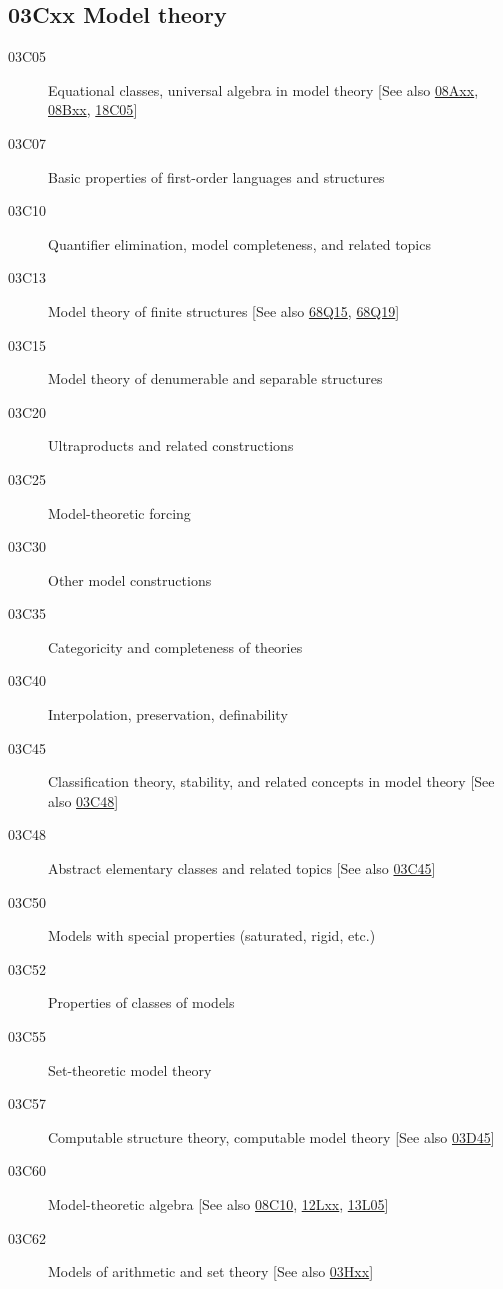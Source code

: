 \documentclass[letterpaper]{article}
\begin{document}
\subsection*{03Cxx  Model theory }\label{03Cxx}
\begin{description} 
\item [03C05]\label{03C05} Equational classes, universal algebra in model theory [See also \hyperref[08Axx]{08Axx}, \hyperref[08Bxx]{08Bxx}, \hyperref[18C05]{18C05}]
\item [03C07]\label{03C07} Basic properties of first-order languages and structures
\item [03C10]\label{03C10} Quantifier elimination, model completeness, and related topics
\item [03C13]\label{03C13} Model theory of finite structures [See also \hyperref[68Q15]{68Q15}, \hyperref[68Q19]{68Q19}]
\item [03C15]\label{03C15} Model theory of denumerable and separable structures
\item [03C20]\label{03C20} Ultraproducts and related constructions
\item [03C25]\label{03C25} Model-theoretic forcing
\item [03C30]\label{03C30} Other model constructions
\item [03C35]\label{03C35} Categoricity and completeness of theories
\item [03C40]\label{03C40} Interpolation, preservation, definability
\item [03C45]\label{03C45} Classification theory, stability, and related concepts in model theory [See also \hyperref[03C48]{03C48}]
\item [03C48]\label{03C48} Abstract elementary classes and related topics [See also \hyperref[03C45]{03C45}]
\item [03C50]\label{03C50} Models with special properties (saturated, rigid, etc.)
\item [03C52]\label{03C52} Properties of classes of models
\item [03C55]\label{03C55} Set-theoretic model theory
\item [03C57]\label{03C57} Computable structure theory, computable model theory [See also \hyperref[03D45]{03D45}]
\item [03C60]\label{03C60} Model-theoretic algebra [See also \hyperref[08C10]{08C10}, \hyperref[12Lxx]{12Lxx}, \hyperref[13L05]{13L05}]
\item [03C62]\label{03C62} Models of arithmetic and set theory [See also \hyperref[03Hxx]{03Hxx}]

\end{description}
\end{document}
